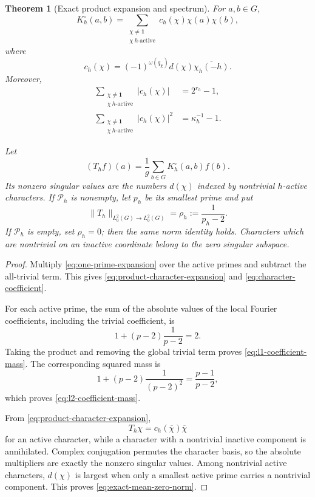 \documentclass[11pt]{article}
\newtheorem{theorem}{Theorem}[section]
\theoremstyle{definition}
\theoremstyle{remark}
\newcommand{\one}{\mathbf 1}
\newcommand{\cP}{\mathcal P}
\begin{document}
\begin{theorem}[Exact product expansion and spectrum]\label{thm:exact-product-spectrum}
For $a,b\in G$,
\begin{equation}\label{eq:product-character-expansion}
 K_h^\circ(a,b)
 =\sum_{\substack{\chi\ne\one\\\chi\ h\text{-active}}}
 c_h(\chi)\chi(a)\chi(b),
\end{equation}
where
\begin{equation}\label{eq:character-coefficient}
 c_h(\chi)
 =(-1)^{\omega(q_\chi)}d(\chi)\overline{\chi_h(-h)}.
\end{equation}
Moreover,
\begin{align}
 \sum_{\substack{\chi\ne\one\\\chi\ h\text{-active}}}|c_h(\chi)|
  &=2^{r_h}-1,\label{eq:l1-coefficient-mass}\\
 \sum_{\substack{\chi\ne\one\\\chi\ h\text{-active}}}|c_h(\chi)|^2
  &=\kappa_h^{-1}-1.\label{eq:l2-coefficient-mass}
\end{align}

Let
\begin{equation}\label{eq:centered-operator}
 (T_hf)(a)=\frac1g\sum_{b\in G}K_h^\circ(a,b)f(b).
\end{equation}
Its nonzero singular values are the numbers $d(\chi)$ indexed by nontrivial $h$-active characters.  If $\cP_h$ is nonempty, let $p_h$ be its smallest prime and put
\begin{equation}\label{eq:exact-mean-zero-norm}
 \|T_h\|_{L^2_0(G)\to L^2_0(G)}
 =\rho_h:=\frac1{p_h-2}.
\end{equation}
If $\cP_h$ is empty, set $\rho_h=0$; then the same norm identity holds.  Characters which are nontrivial on an inactive coordinate belong to the zero singular subspace.
\end{theorem}

\begin{proof}
Multiply \eqref{eq:one-prime-expansion} over the active primes and subtract the all-trivial term.  This gives \eqref{eq:product-character-expansion} and \eqref{eq:character-coefficient}.

For each active prime, the sum of the absolute values of the local Fourier coefficients, including the trivial coefficient, is
\[
 1+(p-2)\frac1{p-2}=2.
\]
Taking the product and removing the global trivial term proves \eqref{eq:l1-coefficient-mass}.  The corresponding squared mass is
\[
 1+(p-2)\frac1{(p-2)^2}=\frac{p-1}{p-2},
\]
which proves \eqref{eq:l2-coefficient-mass}.

From \eqref{eq:product-character-expansion},
\[
 T_h\chi=c_h(\overline\chi)\overline\chi
\]
for an active character, while a character with a nontrivial inactive component is annihilated.  Complex conjugation permutes the character basis, so the absolute multipliers are exactly the nonzero singular values.  Among nontrivial active characters, $d(\chi)$ is largest when only a smallest active prime carries a nontrivial component.  This proves \eqref{eq:exact-mean-zero-norm}.
\end{proof}
\end{document}
